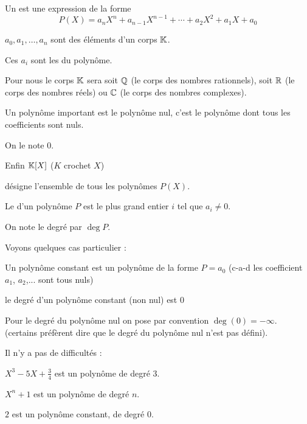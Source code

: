 \diapo

Un   est une expression de la forme
$$P(X) = a_n X^n + a_{n-1} X^{n-1} + \cdots + a_2 X^2 + a_1 X + a_0$$


\change

$a_0,a_1,\ldots,a_n$ sont des éléments d'un corps $\mathbb{K}$.

Ces $a_i$ sont les  du polynôme.

\change

Pour nous le corps $\mathbb{K}$ sera soit $\mathbb{Q}$ (le corps des nombres rationnels), 
soit $\mathbb{R}$ (le corps des nombres réels) ou 
$\mathbb{C}$ (le corps des nombres complexes).

\change

Un polynôme important est le polynôme nul, c'est le polynôme dont tous les coefficients sont nuls.

On le note $0$.


\change

Enfin $\mathbb{K}[X]$ ($K$ crochet $X$)

désigne l'ensemble de tous les polynômes $P(X)$.




\diapo


Le  d'un polynôme $P$ est le plus grand entier $i$ tel que $a_i\not=0$.

On note le degré par $\deg P$. 

\change


Voyons quelques cas particulier : 

Un polynôme constant est un polynôme de la forme $P=a_0$ (c-a-d les coefficient $a_1$, $a_2$,... sont tous nuls)

le degré d'un polynôme constant (non nul) est $0$

\change

Pour le degré du polynôme nul on pose par convention $\deg(0)=-\infty$.
(certains préfèrent dire que le degré du polynôme nul n'est pas défini).


\change

Il n'y a pas de difficultés :

 $X^3-5X+\frac 34$ est un polynôme de degré $3$.
 
 $X^n+1$ est un polynôme de degré $n$.
 
 $2$ est un polynôme constant, de degré $0$.  
 
 
\diapo

